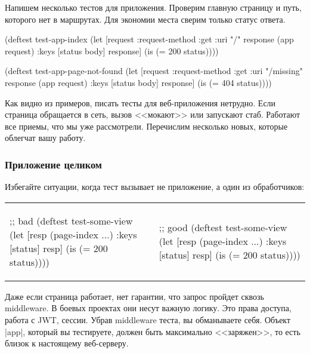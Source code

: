 Напишем несколько тестов для приложения. Проверим главную страницу и путь,
которого нет в маршрутах. Для экономии места сверим только статус ответа.

\begin{english}
  \begin{clojure}
(deftest test-app-index
  (let [request {:request-method :get :uri "/"}
        response (app request)
        {:keys [status body]} response]
    (is (= 200 status))))

(deftest test-app-page-not-found
  (let [request {:request-method :get :uri "/missing"}
        response (app request)
        {:keys [status body]} response]
    (is (= 404 status))))
  \end{clojure}
\end{english}

Как видно из примеров, писать тесты для веб-приложения нетрудно. Если страница
обращается в сеть, вызов <<мокают>> или запускают стаб. Работают все приемы, что
мы уже рассмотрели. Перечислим несколько новых, которые облегчат вашу работу.

\subsubsection*{Приложение целиком}

Избегайте ситуации, когда тест вызывает не приложение, а один из
обработчиков:

\noindent
\begin{tabular}{ @{}p{5.5cm} @{}p{5.2cm} }

\begin{english}
  \begin{clojure}
;; bad
(deftest test-some-view
  (let [resp (page-index {...})
        {:keys [status]} resp]
    (is (= 200 status))))
  \end{clojure}
\end{english}

&

\begin{english}
  \begin{clojure}
;; good
(deftest test-some-view
  (let [resp (page-index {...})
        {:keys [status]} resp]
    (is (= 200 status))))
  \end{clojure}
\end{english}

\end{tabular}

Даже если страница работает, нет гарантии, что запрос пройдет сквозь
middleware. В боевых проектах они несут важную логику. Это права доступа, работа
с JWT, сессии. Убрав middleware теста, вы обманываете себя. Объект \spverb|app|,
который вы тестируете, должен быть максимально <<заряжен>>, то есть близок к
настоящему веб-серверу.

